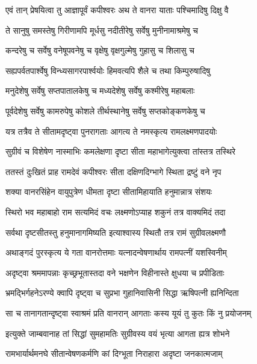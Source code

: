 \twolineshloka
{एवं तान् प्रेषयित्वा तु आज्ञापूर्वं कपीश्वरः}
{अथ ते वानरा याताः पश्चिमादिषु दिक्षु वै} %

\twolineshloka
{ते सानुषु समस्तेषु गिरीणामपि मूर्धसु}
{नदीतीरेषु सर्वेषु मुनीनामाश्रमेषु च} %

\twolineshloka
{कन्दरेषु च सर्वेषु वनेषूपवनेषु च}
{वृक्षेषु वृक्षगुल्मेषु गुहासु च शिलासु च} %

\twolineshloka
{सह्यपर्वतपार्श्वेषु विन्ध्यसागरपार्श्वयोः}
{हिमवत्यपि शैले च तथा किम्पुरुषादिषु} %

\twolineshloka
{मनुदेशेषु सर्वेषु सप्तपातालकेषु च}
{मध्यदेशेषु सर्वेषु कश्मीरेषु महाबलाः} %

\twolineshloka
{पूर्वदेशेषु सर्वेषु कामरुपेषु कोशले}
{तीर्थस्थानेषु सर्वेषु सप्तकोङ्कणकेषु च} %

\twolineshloka
{यत्र तत्रैव ते सीतामदृष्ट्वा पुनरागताः}
{आगत्य ते नमस्कृत्य रामलक्ष्मणपादयोः} %

\twolineshloka
{सुग्रीवं च विशेषेण नास्माभिः कमलेक्षणा}
{दृष्टा सीता महाभागेत्युक्त्वा तांस्तत्र तस्थिरे} %

\twolineshloka
{ततस्तं दुःखितं प्राह रामदेवं कपीश्वरः}
{सीता दक्षिणदिग्भागे स्थिता द्रष्टुं वने नृप} %

\twolineshloka
{शक्या वानरसिंहेन वायुपुत्रेण धीमता}
{दृष्टा सीतामिहायाति हनुमान्नात्र संशयः} %

\twolineshloka
{स्थिरो भव महाबाहो राम सत्यमिदं वचः}
{लक्ष्मणोऽप्याह शकुनं तत्र वाक्यमिदं तदा} %

\twolineshloka
{सर्वथा दृष्टसीतस्तु हनुमानागमिष्यति}
{इत्याश्वास्य स्थितौ तत्र रामं सुग्रीवलक्ष्मणौ} %

\twolineshloka
{अथाङ्गदं पुरस्कृत्य ये गता वानरोत्तमाः}
{यत्नादन्वेषणार्थाय रामपत्नीं यशस्विनीम्} %

\twolineshloka
{अदृष्ट्वा श्रममापन्नाः कृच्छ्रभूतास्तदा वने}
{भक्षणेन विहीनास्ते क्षुधया च प्रपीडिताः} %

\twolineshloka
{भ्रमद्भिर्गहनेऽरण्ये क्वापि दृष्ट्वा च सुप्रभा}
{गुहानिवासिनी सिद्धा ऋषिपत्नी ह्यनिन्दिता} %

\twolineshloka
{सा च तानागतान्दृष्ट्वा स्वाश्रमं प्रति वानरान्}
{आगताः कस्य यूयं तु कुतः किं नु प्रयोजनम्} %

\twolineshloka
{इत्युक्ते जाम्बवानाह तां सिद्धां सुमहामतिः}
{सुग्रीवस्य वयं भृत्या आगता ह्यत्र शोभने} %

\twolineshloka
{रामभार्यार्थमनघे सीतान्वेषणकर्मणि}
{कां दिग्भूता निराहारा अदृष्टा जनकात्मजाम्} %

